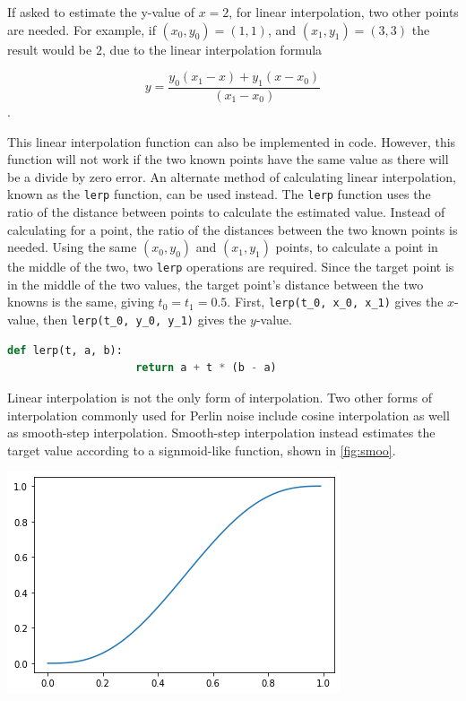 \documentclass[10pt]{report}
\begin{document}
			If asked to estimate the y-value of \(x = 2\), for linear interpolation, two other points are needed. For example, if \((x_0,y_0) = (1,1)\), and \((x_1,y_1) = (3,3)\) the result would be \(2\), due to the linear interpolation formula
			
			\[y = \frac{y_0 (x_1 - x) + y_1 (x - x_0)}{(x_1 - x_0)}\].
			
			This linear interpolation function can also be implemented in code. However, this function will not work if the two known points have the same value as there will be a divide by zero error. An alternate method of calculating linear interpolation, known as the \lstinline|lerp| function, can be used instead. The \lstinline|lerp| function uses the ratio of the distance between points to calculate the estimated value. Instead of calculating for a point, the ratio of the distances between the two known points is needed. Using the same \((x_0,y_0)\) and \((x_1,y_1)\) points, to calculate a point in the middle of the two, two \lstinline|lerp| operations are required. Since the target point is in the middle of the two values, the target point's distance between the two knowns is the same, giving \(t_0 = t_1 = 0.5\). First, \lstinline|lerp(t_0, x_0, x_1)| gives the \(x\)-value, then \lstinline|lerp(t_0, y_0, y_1)| gives the \(y\)-value.
			
			\begin{lstlisting}[label={lst:lerp}, language=Python, frame=none, caption={lerp function in Python.}, captionpos=b]
				def lerp(t, a, b):
					return a + t * (b - a)
			\end{lstlisting}
			
			Linear interpolation is not the only form of interpolation. Two other forms of interpolation commonly used for Perlin noise include cosine interpolation as well as smooth-step interpolation. Smooth-step interpolation instead estimates the target value according to a signmoid-like function, shown in \autoref{fig:smoo}.
			
			\begin{minipage}{\textwidth}
				\centering
				\includegraphics[scale=.5]{smooth}
				\label{fig:smoo}
			\end{minipage}
			
\end{document}
